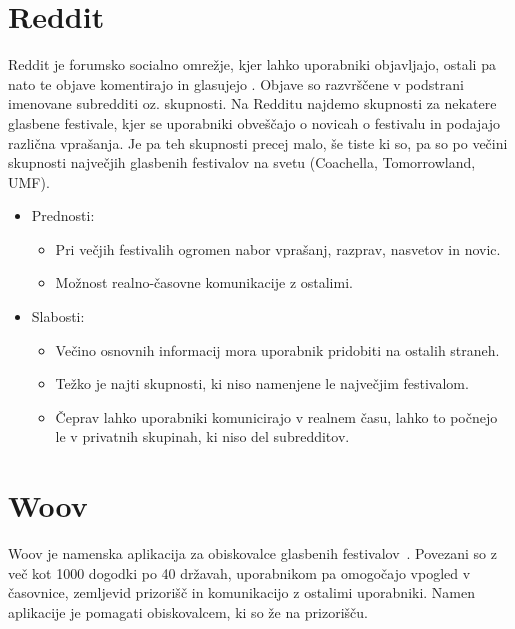 \documentclass[a4paper,12pt,openright]{book}
\begin{document}
\section{Reddit}
Reddit je forumsko socialno omrežje, kjer lahko uporabniki objavljajo, ostali pa nato te objave komentirajo in glasujejo \cite{reddit}. Objave so razvrščene v podstrani imenovane subredditi oz. skupnosti.
Na Redditu najdemo skupnosti za nekatere glasbene festivale, kjer se uporabniki obveščajo o novicah o festivalu in podajajo različna vprašanja. Je pa teh skupnosti precej malo, še tiste ki so, 
pa so po večini skupnosti največjih glasbenih festivalov na svetu (Coachella, Tomorrowland, UMF).

\begin{itemize}
    \item Prednosti:
        \begin{itemize}
            \item Pri večjih festivalih ogromen nabor vprašanj, razprav, nasvetov in novic.
            \item Možnost realno-časovne komunikacije z ostalimi.
        \end{itemize}
    \item Slabosti:
        \begin{itemize}
            \item Večino osnovnih informacij mora uporabnik pridobiti na ostalih straneh.
            \item Težko je najti skupnosti, ki niso namenjene le največjim festivalom.
            \item Čeprav lahko uporabniki komunicirajo v realnem času, lahko to počnejo le v privatnih skupinah, ki niso del subredditov.
        \end{itemize}
\end{itemize}

\section{Woov}
Woov je namenska aplikacija za obiskovalce glasbenih festivalov~\cite{woov}. Povezani so z več kot 1000 dogodki po 40 državah, uporabnikom pa omogočajo vpogled v časovnice, zemljevid prizorišč in komunikacijo z ostalimi uporabniki.
Namen aplikacije je pomagati obiskovalcem, ki so že na prizorišču.
\end{document}
